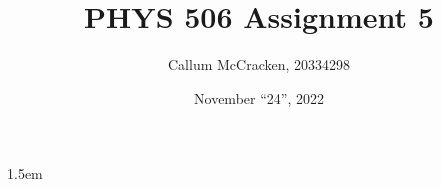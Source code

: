 \documentclass[12pt,letterpaper]{article}
\newcommand{\0}{\mathcal{O}}
\begin{document}
\thispagestyle{fancyplain}
\headheight 35pt
\author{Callum McCracken, 20334298}
\title{PHYS 506 Assignment 5}
\date{November ``24'', 2022}
\rfoot{\small\thepage}
\headsep 1.5em

\maketitle
\newpage


\newpage

\newpage

\newpage

\newpage

\end{document}
